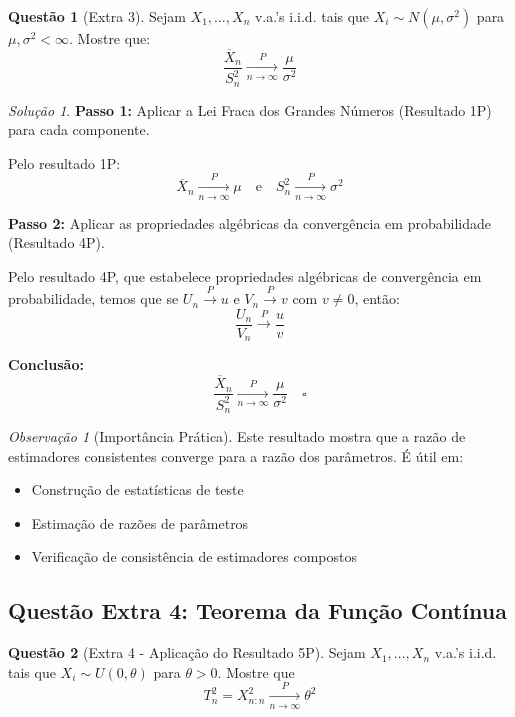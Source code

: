 \documentclass[12pt,a4paper]{article}
\theoremstyle{definition}
\newtheorem{questao}{Questão}[section]
\theoremstyle{remark}
\newtheorem{solucao}{Solução}[section]
\newtheorem{observacao}{Observação}[section]
\begin{document}
\begin{questao}[Extra 3]
Sejam $X_1, \ldots, X_n$ v.a.'s i.i.d. tais que $X_i \sim N(\mu, \sigma^2)$ para $\mu, \sigma^2 < \infty$. Mostre que:
\[
\frac{\overline{X}_n}{S_n^2} \xrightarrow[n \to \infty]{P} \frac{\mu}{\sigma^2}
\]
\end{questao}

\begin{solucao}
\textbf{Passo 1:} Aplicar a Lei Fraca dos Grandes Números (Resultado 1P) para cada componente.

Pelo resultado 1P:
\[
\overline{X}_n \xrightarrow[n \to \infty]{P} \mu \quad \text{e} \quad S_n^2 \xrightarrow[n \to \infty]{P} \sigma^2
\]

\textbf{Passo 2:} Aplicar as propriedades algébricas da convergência em probabilidade (Resultado 4P).

Pelo resultado 4P, que estabelece propriedades algébricas de convergência em probabilidade, temos que se $U_n \xrightarrow{P} u$ e $V_n \xrightarrow{P} v$ com $v \neq 0$, então:
\[
\frac{U_n}{V_n} \xrightarrow{P} \frac{u}{v}
\]

\textbf{Conclusão:}
\[
\frac{\overline{X}_n}{S_n^2} \xrightarrow[n \to \infty]{P} \frac{\mu}{\sigma^2} \quad \square
\]
\end{solucao}

\begin{observacao}[Importância Prática]
Este resultado mostra que a razão de estimadores consistentes converge para a razão dos parâmetros. É útil em:
\begin{itemize}
    \item Construção de estatísticas de teste
    \item Estimação de razões de parâmetros
    \item Verificação de consistência de estimadores compostos
\end{itemize}
\end{observacao}

\subsection{Questão Extra 4: Teorema da Função Contínua}

\begin{questao}[Extra 4 - Aplicação do Resultado 5P]
Sejam $X_1, \ldots, X_n$ v.a.'s i.i.d. tais que $X_i \sim U(0, \theta)$ para $\theta > 0$. Mostre que
\[
T_n^2 = X_{n:n}^2 \xrightarrow[n \to \infty]{P} \theta^2
\]
\end{questao}
\end{document}
